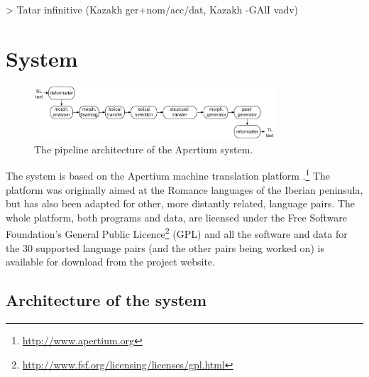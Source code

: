 \documentclass[11pt]{article}
\begin{document}
> Tatar infinitive (Kazakh ger+nom/acc/dat, Kazakh -GAlI vadv)

\section{System}
\label{sec:sys}

\begin{figure}[htbp]
\begin{center}
 \includegraphics[width=0.8\textwidth]{architecture.pdf}
\end{center}
\caption{The pipeline architecture of the Apertium system.}
\label{fig:modules}
\end{figure}

The system is based on the Apertium machine translation 
platform \citep{apertium/2011}.\footnote{\url{http://www.apertium.org}} The 
platform was originally aimed at the Romance languages of the Iberian peninsula, but has also been adapted for 
other, more distantly related, language pairs.
The whole platform, both programs and data, are licensed under the Free Software Foundation's General Public 
Licence\footnote{\url{http://www.fsf.org/licensing/licenses/gpl.html}} (GPL) and all the software and data for the 
30 supported language pairs (and the other pairs being worked on) is available for download from the project 
website.

\subsection{Architecture of the system}
\end{document}
